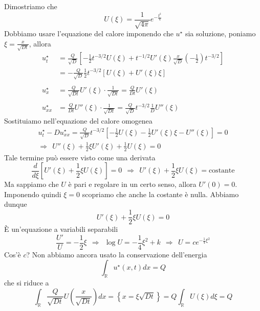 \documentclass[10pt,a4paper,twoside,openright]{book}
\begin{document}
Dimostriamo che
\begin{equation*}
U(\xi) =\frac{1}{\sqrt{4\pi }} e^{-\frac{\xi ^{2}}{4}}
\end{equation*}
Dobbiamo usare l'equazione del calore imponendo che $u^{\star }$ sia soluzione, poniamo $\xi =\frac{x}{\sqrt{Dt}}$, allora
\begin{align*}
u^{\star }_{t} & =\frac{Q}{\sqrt{D}}\left[ -\frac{1}{2} t^{-3/2} U(\xi) +t^{-1/2} U'(\xi)\frac{x}{\sqrt{D}}\left( -\frac{1}{2}\right) t^{-3/2}\right]\\
 & =-\frac{Q}{\sqrt{D}}\frac{1}{2} t^{-3/2}[ U(\xi) +U'(\xi) \xi ]\\
 & \\
u^{\star }_{x} & =\frac{Q}{\sqrt{Dt}} U'(\xi) \cdotp \frac{1}{\sqrt{Dt}} =\frac{Q}{Dt} U'(\xi)\\
 & \\
u^{\star }_{xx} & =\frac{Q}{Dt} U''(\xi) \cdotp \frac{1}{\sqrt{Dt}} =\frac{Q}{\sqrt{D}} t^{-3/2}\frac{1}{D} U''(\xi)
\end{align*}
Sostituiamo nell'equazione del calore omogenea
\begin{gather*}
u^{\star }_{t} -Du^{\star }_{xx} =\frac{Q}{\sqrt{D}} t^{-3/2}\left[ -\frac{1}{2} U(\xi) -\frac{1}{2} U'(\xi) \xi -U''(\xi)\right] =0\\
\Rightarrow \ \ U''(\xi) +\frac{1}{2} \xi U'(\xi) +\frac{1}{2} U(\xi) =0
\end{gather*}
Tale termine può essere visto come una derivata
\begin{equation*}
\frac{d}{d\xi }\left[ U'(\xi) +\frac{1}{2} \xi U(\xi)\right] =0\ \ \Rightarrow \ \ U'(\xi) +\frac{1}{2} \xi U(\xi) =\text{costante}
\end{equation*}
Ma sappiamo che $U$ è pari e regolare in un certo senso, allora $U'(0) =0$. Imponendo quindi $\xi =0$ scopriamo che anche la costante è nulla. Abbiamo dunque
\begin{equation*}
U'(\xi) +\frac{1}{2} \xi U(\xi) =0
\end{equation*}
È un'equazione a variabili separabili
\begin{equation*}
\frac{U'}{U} =-\frac{1}{2} \xi \ \ \Rightarrow \ \ \log U=-\frac{1}{4} \xi ^{2} +k\ \ \Rightarrow \ \ U=ce^{-\frac{1}{4} \xi ^{2}}
\end{equation*}
Cos'è $c$? Non abbiamo ancora usato la conservazione dell'energia
\begin{equation*}
\int _{\mathbb{R}} u^{\star }(x,t) dx=Q
\end{equation*}
che si riduce a
\begin{equation*}
\int _{\mathbb{R}}\frac{Q}{\sqrt{Dt}} U\left(\frac{x}{\sqrt{Dt}}\right) dx=\left\{x=\xi\sqrt{Dt}\right\} =Q\int _{\mathbb{R}} U(\xi) d\xi =Q
\end{equation*}
\end{document}
